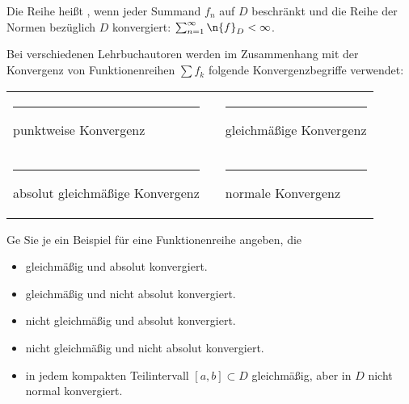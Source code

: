 \begin{antwort}
Die Reihe heißt , wenn jeder Summand 
$f_n$ auf $D$ beschränkt und die Reihe der Normen bezüglich 
$D$ konvergiert: $\sum_{n=1}^\infty \n{f}_D  < \infty$.
\AntEnd
\end{antwort}

\begin{frage}
Bei verschiedenen Lehrbuchautoren werden im Zusammenhang mit der Konvergenz 
von Funktionenreihen $\sum f_k$ folgende Konvergenzbegriffe verwendet: 

\medskip
\begin{tabular}{lp{3mm}l}
\rule{4pt}{4pt}\quad punktweise Konvergenz & &
\rule{4pt}{4pt}\quad gleichmäßige Konvergenz \\
\rule{4pt}{4pt}\quad absolut gleichmäßige Konvergenz & &
\rule{4pt}{4pt}\quad normale Konvergenz
\end{tabular}

\medskip\noindent%
Ge Sie je ein Beispiel für eine 
Funktionenreihe angeben, die 
\begin{itemize}[4mm]
\item[\desc{1}] gleichmäßig und absolut konvergiert.\\[-4mm]
\item[\desc{2}] gleichmäßig und nicht absolut konvergiert.\\[-4mm]
\item[\desc{3}] nicht gleichmäßig und absolut konvergiert.\\[-4mm]
\item[\desc{4}] nicht gleichmäßig und nicht absolut konvergiert.\\[-4mm]
\item[\desc{5}] in jedem kompakten Teilintervall $[a,b]\subset D$ 
gleichmäßig, aber in $D$ nicht normal konvergiert.
\end{itemize}
\end{frage}


